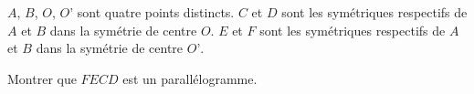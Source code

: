 
$A$, $B$, $O$, $O’$ sont quatre points distincts. $C$ et $D$ sont les symétriques respectifs de $A$ et $B$ dans la symétrie de centre $O$. $E$ et $F$ sont les symétriques respectifs de $A$ et $B$ dans la symétrie de centre $O’$.

Montrer que $FECD$ est un parallélogramme.